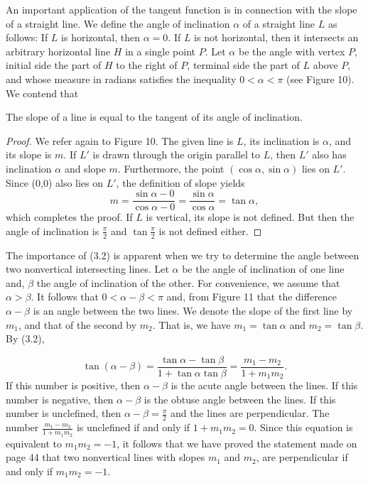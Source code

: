 An important application of the tangent function is in connection with the slope of a straight line. We define the angle of inclination $\alpha$ of a straight line $L$ as follows: If $L$ is horizontal, then $\alpha = 0$. If $L$ is not horizontal, then it intersects an arbitrary horizontal line $H$ in a single point $P$. Let $\alpha$ be the angle with vertex $P$, initial side the part of $H$ to the right of $P$, terminal side the part of $L$ above $P$, and whose measure in radians satisfies the inequality $0 < \alpha < \pi$ (see Figure 10). We contend that

\begin{theorem} %
The slope of a line is equal to the tangent of its angle of inclination.
\end{theorem}


\begin{proof}
We refer again to Figure 10. The given line is $L$, its inclination is $\alpha$, and its slope is $m$. If $L'$ is drawn through the origin parallel to $L$, then $L'$ also has
inclination $\alpha$ and slope $m$. Furthermore, the point $(\cos \alpha, \sin \alpha)$ lies on $L'$.
Since (0,0) also lies on $L'$, the definition of slope yields
$$
m = \frac{\sin \alpha - 0}{\cos \alpha - 0} = \frac{\sin \alpha}{\cos \alpha} = \tan \alpha,  
$$
which completes the proof. If $L$ is vertical, its slope is not defined. But then the angle of inclination is $\frac{\pi}{2}$ and $\tan\frac{\pi}{2}$ is not defined either.
\end{proof}



The importance of (3.2) is apparent when we try to determine the angle between two nonvertical intersecting lines. Let $\alpha$ be the angle of inclination of one line and, $\beta$ the angle of inclination of the other. For convenience, we assume that $\alpha > \beta$.  It follows that $0 < \alpha - \beta < \pi$ and, from Figure 11
that the difference $\alpha - \beta$ is an angle between the two lines. We denote the slope of the first line by $m_{1}$, and that of the second by $m_{2}$. That is, we have $m_{1} = \tan \alpha$ and $m_{2} = \tan \beta$. By (3.2),

$$
\tan (\alpha - \beta) = \frac{\tan \alpha - \tan \beta}{1 + \tan \alpha \tan\beta} = \frac{m_{1} - m_{2}}{1 + m_{1}m_{2}}.
$$
\noindent If this number is positive, then $\alpha - \beta$ is the acute angle between the lines. If this number is negative, then $\alpha - \beta$ is the obtuse angle between the lines. If this number is unclefined, then $\alpha - \beta = \frac{\pi}{2}$ and the lines are perpendicular. The number $\frac{m_{1} - m_{2}}{1 + m_{1}m_{2}}$ is unclefined if and only if $1 + m_{1}m_{2} = 0$. Since this equation is equivalent to $m_{1} m_{2} = - 1$, it follows that we have proved the statement made on page 44 that two nonvertical lines with slopes $m_{1}$ and $m_{2}$, are perpendicular if and only if $m_{1}m_{2} = - 1$.

